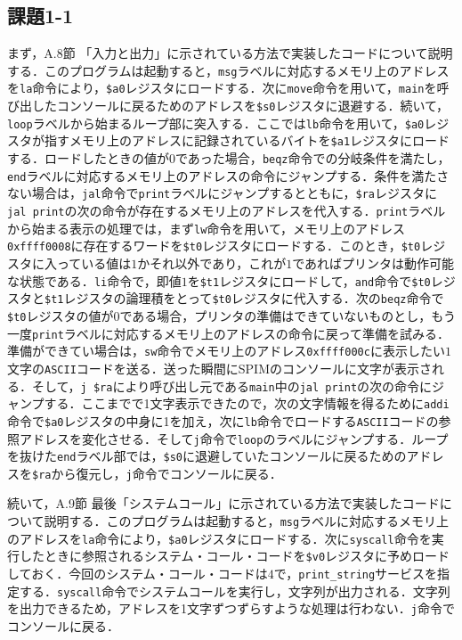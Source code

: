 \subsection{課題1-1}
まず，A.8節 「入力と出力」に示されている方法で実装したコードについて説明する\cite{book:assembly}．このプログラムは起動すると，\verb|msg|ラベルに対応するメモリ上のアドレスを\verb|la|命令により，\verb|$a0|レジスタにロードする．次に\verb|move|命令を用いて，\verb|main|を呼び出したコンソールに戻るためのアドレスを\verb|$s0|レジスタに退避する．続いて，\verb|loop|ラベルから始まるループ部に突入する．ここでは\verb|lb|命令を用いて，\verb|$a0|レジスタが指すメモリ上のアドレスに記録されているバイトを\verb|$a1|レジスタにロードする．ロードしたときの値が$0$であった場合，\verb|beqz|命令での分岐条件を満たし，\verb|end|ラベルに対応するメモリ上のアドレスの命令にジャンプする．条件を満たさない場合は，\verb|jal|命令で\verb|print|ラベルにジャンプするとともに，\verb|$ra|レジスタに\verb|jal print|の次の命令が存在するメモリ上のアドレスを代入する．\verb|print|ラベルから始まる表示の処理では，まず\verb|lw|命令を用いて，メモリ上のアドレス\verb|0xffff0008|に存在するワードを\verb|$t0|レジスタにロードする．このとき，\verb|$t0|レジスタに入っている値は$1$かそれ以外であり，これが$1$であればプリンタは動作可能な状態である．\verb|li|命令で，即値$1$を\verb|$t1|レジスタにロードして，\verb|and|命令で\verb|$t0|レジスタと\verb|$t1|レジスタの論理積をとって\verb|$t0|レジスタに代入する．次の\verb|beqz|命令で\verb|$t0|レジスタの値が$0$である場合，プリンタの準備はできていないものとし，もう一度\verb|print|ラベルに対応するメモリ上のアドレスの命令に戻って準備を試みる．準備ができてい場合は，\verb|sw|命令でメモリ上のアドレス\verb|0xffff000c|に表示したい$1$文字の\verb|ASCII|コードを送る．送った瞬間にSPIMのコンソールに文字が表示される．そして，\verb|j $ra|により呼び出し元である\verb|main|中の\verb|jal print|の次の命令にジャンプする．ここまでで1文字表示できたので，次の文字情報を得るために\verb|addi|命令で\verb|$a0|レジスタの中身に1を加え，次に\verb|lb|命令でロードする\verb|ASCII|コードの参照アドレスを変化させる．そして\verb|j|命令で\verb|loop|のラベルにジャンプする．ループを抜けた\verb|end|ラベル部では，\verb|$s0|に退避していたコンソールに戻るためのアドレスを\verb|$ra|から復元し，\verb|j|命令でコンソールに戻る．

続いて，A.9節 最後「システムコール」に示されている方法で実装したコードについて説明する\cite{book:assembly}．このプログラムは起動すると，\verb|msg|ラベルに対応するメモリ上のアドレスを\verb|la|命令により，\verb|$a0|レジスタにロードする．次に\verb|syscall|命令を実行したときに参照されるシステム・コール・コードを\verb|$v0|レジスタに予めロードしておく．今回のシステム・コール・コードは$4$で，\verb|print_string|サービスを指定する．\verb|syscall|命令でシステムコールを実行し，文字列が出力される．文字列を出力できるため，アドレスを1文字ずつずらすような処理は行わない．\verb|j|命令でコンソールに戻る．

